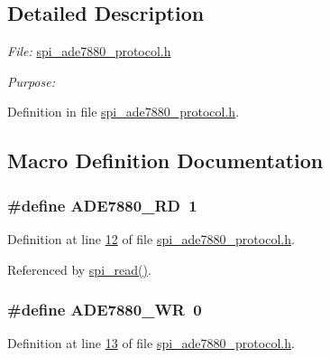 \subsection{Detailed Description}
{\itshape File\-:} \hyperlink{a00041}{spi\-\_\-ade7880\-\_\-protocol.\-h} \par
 {\itshape Purpose\-:} \par
 

Definition in file \hyperlink{a00041_source}{spi\-\_\-ade7880\-\_\-protocol.\-h}.



\subsection{Macro Definition Documentation}
\hypertarget{a00041_a30e8f63608e6153585d75dc479a03177}{
\subsubsection[{A\-D\-E7880\-\_\-\-R\-D}]{\setlength{\rightskip}{0pt plus 5cm}\#define A\-D\-E7880\-\_\-\-R\-D~1}}\label{dd/d32/a00041_a30e8f63608e6153585d75dc479a03177}


Definition at line \hyperlink{a00041_source_l00012}{12} of file \hyperlink{a00041_source}{spi\-\_\-ade7880\-\_\-protocol.\-h}.



Referenced by \hyperlink{a00040_source_l00147}{spi\-\_\-read()}.

\hypertarget{a00041_a36352e0d88dc7c5ede031013c75a678f}{
\subsubsection[{A\-D\-E7880\-\_\-\-W\-R}]{\setlength{\rightskip}{0pt plus 5cm}\#define A\-D\-E7880\-\_\-\-W\-R~0}}\label{dd/d32/a00041_a36352e0d88dc7c5ede031013c75a678f}


Definition at line \hyperlink{a00041_source_l00013}{13} of file \hyperlink{a00041_source}{spi\-\_\-ade7880\-\_\-protocol.\-h}.



